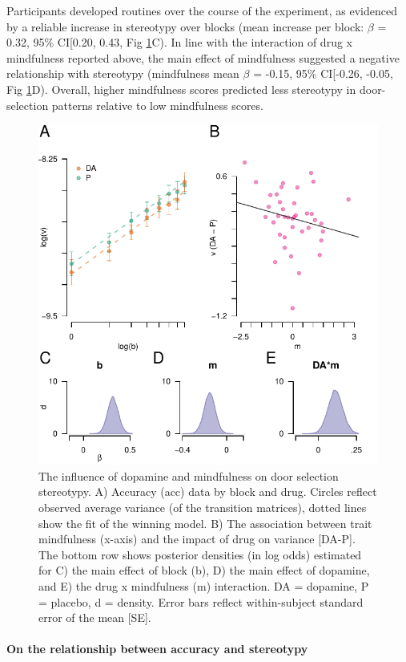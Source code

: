 \documentclass{article}
\begin{document}
Participants developed routines over the course of the experiment, as
evidenced by a reliable increase in stereotypy over blocks (mean
increase per block: \(\beta\) = 0.32, 95\% CI{[}0.20, 0.43, Fig
\ref{fig:stereofig}C). In line with the interaction of drug x
mindfulness reported above, the main effect of mindfulness suggested a
negative relationship with stereotypy (mindfulness mean \(\beta\) =
-0.15, 95\% CI{[}-0.26, -0.05, Fig \ref{fig:stereofig}D). Overall,
higher mindfulness scores predicted less stereotypy in door-selection
patterns relative to low mindfulness scores.

\begin{figure}

{\centering \includegraphics[width=0.7\linewidth]{../../images/s_fig} 

}

\caption{The influence of dopamine and mindfulness on door selection stereotypy. A) Accuracy (acc) data by block and drug. Circles reflect observed average variance (of the transition matrices), dotted lines show the fit of the winning model. B) The association between trait mindfulness (x-axis) and the impact of drug on variance [DA-P]. The bottom row shows posterior densities (in log odds) estimated for C) the main effect of block (b), D) the main effect of dopamine, and E) the drug x mindfulness (m) interaction. DA = dopamine, P = placebo, d = density. Error bars reflect within-subject standard error of the mean [SE].}\label{fig:stereofig}
\end{figure}

\hypertarget{on-the-relationship-between-accuracy-and-stereotypy}{%
\paragraph{On the relationship between accuracy and
stereotypy}\label{on-the-relationship-between-accuracy-and-stereotypy}}
\end{document}
